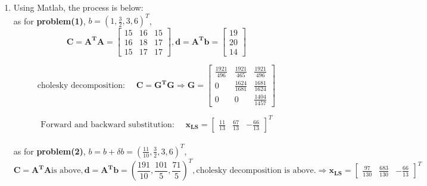 \documentclass[english,onecolumn]{IEEEtran}
\begin{document}
\begin{enumerate}
    {\bf Secondly:}\\
    $\because \bf \|\delta b \| = \| (b + \delta b) - b \| = \| A (x + \delta x - x) \| \le \|A\| \| \delta x \|      $\\
    $\because \bf x = A^{\dagger} b \quad \Rightarrow \quad \|x\| \le \|A^{\dagger}\| \|b \| \quad \Rightarrow \quad \frac{1}{\|b\|} \le \frac{\|A^{\dagger}\|}{\|x\|} $\\
    $\therefore \bf \frac{\|\delta b \|}{\|b\|} \le \|A\| \| \delta x \| \frac{\|A^{\dagger}\|}{\|x\|} \quad \Rightarrow \quad \frac{1}{\|A\| \|A^{\dagger}\|} \frac{\| \delta b\|}{\|b\|} \le \frac{\| \delta x \|}{\|x \|}     $\\
    
    Then we can get:
    $\bf  \quad\quad \frac{1}{\|{\bf A}\| \|{\bf A}^{\dagger}\|} \frac{\|\delta {\bf b}\|}{\|{\bf b}\|}
    \leq \frac{\|\delta {\bf x}\|}{\|{\bf x}\|} \leq
    \|{\bf A}\| \|{\bf A}^{\dagger}\|\frac{\|\delta {\bf b}\|}{\|{\bf b}\|}$
    
    
    \item
    
    Using Matlab, the process is below:\\
    as for \textbf{problem(1)}, $b= (1,\frac{3}{2},3,6)^T$,\\
    $$
    \mathbf{C=  A^T A} = 
    \begin{bmatrix}
    15 & 16  &  15  \\
    16 & 18  &  17  \\
    15 & 17  &  17  
    \end{bmatrix} ,  \mathbf{d = A^T b} = 
    \begin{bmatrix}
    19 \\ 20  \\  14  
    \end{bmatrix} $$ 
    
    $$
    \text{cholesky decomposition:  } \quad
    \mathbf{C = G^T G}  \Rightarrow  \mathbf{G} = 
    \begin{bmatrix}
    \frac{1921}{496} & \frac{1921}{465}  & \frac{1921}{496}  \\
    0 & \frac{1624}{1681}  &  \frac{1681}{1624}  \\
    0 & 0  &  \frac{1404}{1457}  
    \end{bmatrix}
    $$
    
    $$
    \text{Forward and backward substitution:  } \quad
    \mathbf{x_{LS}}  = \begin{bmatrix}
    \frac{11}{13} & \frac{67}{13}  &  -\frac{66}{13}  
    \end{bmatrix} ^T
    $$\\
    as for \textbf{problem(2)}, $b=b + \delta b =  (\frac{11}{10},\frac{3}{2},3,6)^T$,\\
    $$\mathbf{C = A^T A } \text{is above}  , \mathbf{d = A^T b} = (\frac{191}{10}, \frac{101}{5}, \frac{71}{5} )^T , \text{cholesky decomposition is above.} 
    \Rightarrow \mathbf{x_{LS}} = \begin{bmatrix}
    \frac{97}{130} & \frac{683}{130}  &  -\frac{66}{13}  
    \end{bmatrix} ^T
    $$


\end{enumerate}
\end{document}

